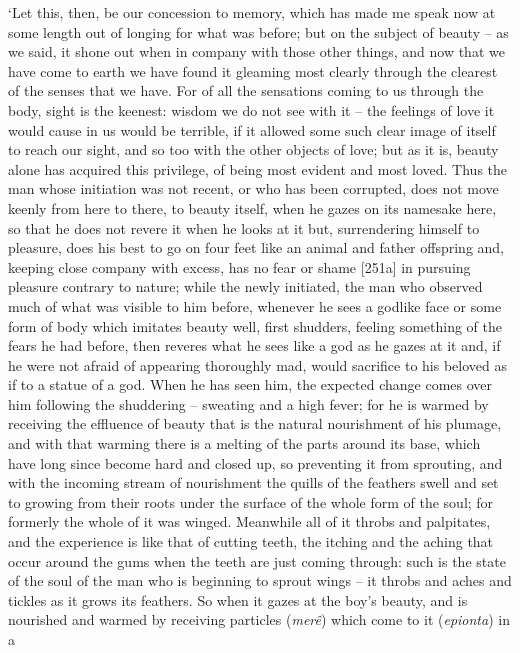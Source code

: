 ‘Let this, then, be our concession to memory, which has made me speak
now at some length out of longing for what was
before; but on the
subject of beauty -- as we said, it shone out  when in company
with those other things, and now that we have come to earth we have
found it gleaming most clearly through the clearest of the senses that
we have. For of all the sensations coming to us through the body, sight
is the keenest: wisdom we do not see with it -- the feelings of love it
would  cause in us would be terrible, if it allowed some such
clear image of itself to reach our sight, and so too with the other
objects of love; but as
it is, beauty alone has acquired this privilege, of being most evident
and most loved. Thus the man  whose initiation was not recent,
or who has been corrupted, does not move keenly from here to there, to
beauty itself, when he gazes on its namesake here, so that he does not
revere it when he looks at it but, surrendering himself to pleasure,
does his best to go on four feet like an animal and father offspring
 and, keeping close company with
excess, has no fear or
shame {[}251a{]} in pursuing pleasure contrary to nature; while the
newly initiated, the man who observed much of what was visible to him
before, whenever he sees a godlike face or some form of body which
imitates beauty well, first shudders, feeling something of the fears he
had before, then reveres what he sees like  a god as he gazes at
it and, if he were not afraid of appearing thoroughly mad, would
sacrifice to his beloved as if to a statue of a god. When he has seen
him, the expected change comes  over him following the
shuddering -- sweating and a high fever; for he is warmed by receiving
the effluence of beauty that is the natural nourishment of his plumage,
and with that warming there is a melting of the parts around its base,
which have  long since become hard and closed up, so preventing
it from sprouting, and with the incoming stream of nourishment the
quills of the feathers swell and set to growing from their roots under
the surface of the whole form of the soul; for formerly  the
whole of it was winged. Meanwhile all of it throbs and palpitates, and
the experience is like that of cutting teeth, the itching and the aching
that occur around the gums when the teeth are just coming through: such
is the state of the soul of  the man who is beginning to sprout
wings -- it throbs and aches and tickles as it grows its feathers. So
when it gazes at the boy's beauty, and is nourished and warmed by
receiving particles ({\em merê}) which come to it ({\em epionta}) in a
